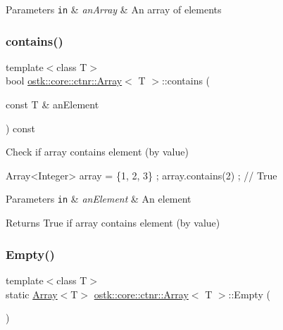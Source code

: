 \begin{DoxyParams}[1]{Parameters}
\mbox{\tt in}  & {\em an\+Array} & An array of elements \\
\hline
\end{DoxyParams}
\mbox{\label{classostk_1_1core_1_1ctnr_1_1_array_a85fc440424ec33983e25238e9cbde67d}} 
\subsubsection{\texorpdfstring{contains()}{contains()}}
{\footnotesize\ttfamily template$<$class T$>$ \\
bool \hyperlink{classostk_1_1core_1_1ctnr_1_1_array}{ostk\+::core\+::ctnr\+::\+Array}$<$ T $>$\+::contains (\begin{DoxyParamCaption}\item[{const T \&}]{an\+Element }\end{DoxyParamCaption}) const}



Check if array contains element (by value) 


\begin{DoxyCode}
Array<Integer> array = \{1, 2, 3\} ;
array.contains(2) ; \textcolor{comment}{// True}
\end{DoxyCode}



\begin{DoxyParams}[1]{Parameters}
\mbox{\tt in}  & {\em an\+Element} & An element \\
\hline
\end{DoxyParams}
\begin{DoxyReturn}{Returns}
True if array contains element (by value) 
\end{DoxyReturn}
\mbox{\label{classostk_1_1core_1_1ctnr_1_1_array_a0d6dc521540ee128b43a66663c9f3dd8}} 
\subsubsection{\texorpdfstring{Empty()}{Empty()}}
{\footnotesize\ttfamily template$<$class T$>$ \\
static \hyperlink{classostk_1_1core_1_1ctnr_1_1_array}{Array}$<$T$>$ \hyperlink{classostk_1_1core_1_1ctnr_1_1_array}{ostk\+::core\+::ctnr\+::\+Array}$<$ T $>$\+::Empty (\begin{DoxyParamCaption}{ }\end{DoxyParamCaption})\hspace{0.3cm}{\ttfamily [static]}}



